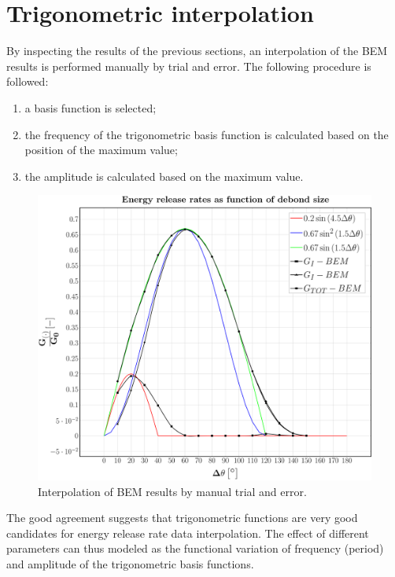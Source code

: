 \documentclass[a4paper]{jpconf}
\begin{document}
\clearpage


\section{Trigonometric interpolation}

By inspecting the results of the previous sections, an interpolation of the BEM results is performed manually by trial and error. The following procedure is followed:

\begin{enumerate}
\item a basis function is selected;
\item the frequency of the trigonometric basis function is calculated based on the position of the maximum value;
\item the amplitude is calculated based on the maximum value.
\end{enumerate}

\begin{figure}[!h]
\includegraphics[width=\textwidth]{Gsplot.pdf}
\caption{Interpolation of BEM results by manual trial and error.}
\end{figure}

The good agreement suggests that trigonometric functions are very good candidates for energy release rate data interpolation. The effect of different parameters can thus modeled as the functional variation of frequency (period) and amplitude of the trigonometric basis functions.
\end{document}
